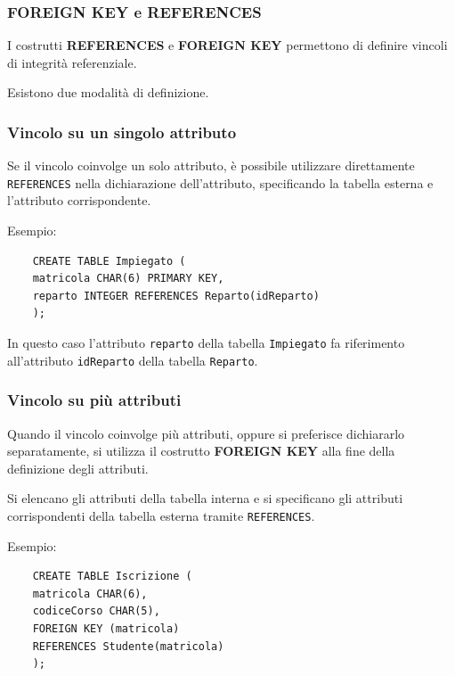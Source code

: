 \subsubsection*{FOREIGN KEY e REFERENCES}

I costrutti \textbf{REFERENCES} e \textbf{FOREIGN KEY} permettono di definire
vincoli di integrità referenziale.

Esistono due modalità di definizione.

\subsubsection*{Vincolo su un singolo attributo}

Se il vincolo coinvolge un solo attributo, è possibile utilizzare direttamente
\texttt{REFERENCES} nella dichiarazione dell'attributo, specificando la tabella
esterna e l'attributo corrispondente.

Esempio:

\begin{verbatim}
	CREATE TABLE Impiegato (
	matricola CHAR(6) PRIMARY KEY,
	reparto INTEGER REFERENCES Reparto(idReparto)
	);
\end{verbatim}

In questo caso l'attributo \texttt{reparto} della tabella \texttt{Impiegato}
fa riferimento all'attributo \texttt{idReparto} della tabella \texttt{Reparto}.

\subsubsection*{Vincolo su più attributi}

Quando il vincolo coinvolge più attributi, oppure si preferisce dichiararlo
separatamente, si utilizza il costrutto \textbf{FOREIGN KEY} alla fine della
definizione degli attributi.

Si elencano gli attributi della tabella interna e si specificano gli
attributi corrispondenti della tabella esterna tramite \texttt{REFERENCES}.

Esempio:

\begin{verbatim}
	CREATE TABLE Iscrizione (
	matricola CHAR(6),
	codiceCorso CHAR(5),
	FOREIGN KEY (matricola)
	REFERENCES Studente(matricola)
	);
\end{verbatim}

